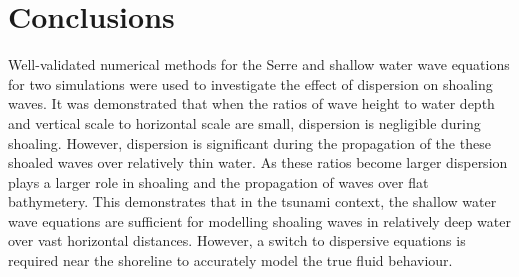 \documentclass[a4paper,fleqn]{article} %
\begin{document}
\section{Conclusions}
\label{Conclusions}
Well-validated numerical methods for the Serre and shallow water wave equations for two simulations were used to investigate the effect of dispersion on shoaling waves. It was demonstrated that when the ratios of wave height to water depth and vertical scale to horizontal scale are small, dispersion is negligible during shoaling. However, dispersion is significant during the propagation of the these shoaled waves over relatively thin water. As these ratios become larger dispersion plays a larger role in shoaling and the propagation of waves over flat bathymetery. This demonstrates that in the tsunami context, the shallow water wave equations are sufficient for modelling shoaling waves in relatively deep water over vast horizontal distances. However, a switch to dispersive equations is required near the shoreline to accurately model the true fluid behaviour.   

\newpage	

\end{document}

